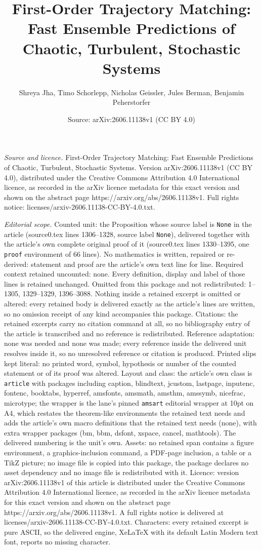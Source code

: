 \documentclass[10pt,a4paper]{amsart}
\title[First-Order Trajectory Matching: Fast Ensemble Predictions o]{First-Order Trajectory Matching: Fast Ensemble Predictions of Chaotic, Turbulent, Stochastic Systems}
\author{Shreya Jha, Timo Schorlepp, Nicholas Geissler, Jules Berman, Benjamin Peherstorfer}
\date{Source: arXiv:2606.11138v1 (CC BY 4.0)}
\begin{document}
\maketitle

\noindent\emph{Source and licence.} First-Order Trajectory Matching: Fast Ensemble Predictions of Chaotic, Turbulent, Stochastic Systems. Version arXiv:2606.11138v1 (CC BY 4.0), distributed under the Creative Commons Attribution 4.0 International licence, as recorded in the arXiv licence metadata for this exact version and shown on the abstract page https://arxiv.org/abs/2606.11138v1. Full rights notice: licenses/arxiv-2606.11138-CC-BY-4.0.txt.\par\smallskip

\noindent\textit{Editorial scope.} Counted unit: the Proposition whose source label is \texttt{None} in the article (source0.tex lines 1306--1328, source label \texttt{None}), delivered together with the article's own complete original proof of it (source0.tex lines 1330--1395, one \texttt{proof} environment of 66 lines). No mathematics is written, repaired or re-derived: statement and proof are the article's own text line for line. Required context retained uncounted: none. Every definition, display and label of those lines is retained unchanged. Omitted from this package and not redistributed: 1--1305, 1329--1329, 1396--3088. Nothing inside a retained excerpt is omitted or altered: every retained body is delivered exactly as the article's lines are written, so no omission receipt of any kind accompanies this package. Citations: the retained excerpts carry no citation command at all, so no bibliography entry of the article is transcribed and no reference is redistributed. Reference adaptation: none was needed and none was made; every reference inside the delivered unit resolves inside it, so no unresolved reference or citation is produced. Printed slips kept literal: no printed word, symbol, hypothesis or number of the counted statement or of its proof was altered. Layout and class: the article's own class is \texttt{article} with packages including caption, blindtext, jcustom, lastpage, inputenc, fontenc, booktabs, hyperref, amsfonts, amsmath, amsthm, amssymb, nicefrac, microtype; the wrapper is the lane's pinned \texttt{amsart} editorial wrapper at 10pt on A4, which restates the theorem-like environments the retained text needs and adds the article's own macro definitions that the retained text needs (none), with extra wrapper packages (bm, bbm, dsfont, xspace, cancel, mathtools). The delivered numbering is the unit's own. Assets: no retained span contains a figure environment, a graphics-inclusion command, a PDF-page inclusion, a table or a TikZ picture; no image file is copied into this package, the package declares no asset dependency and no image file is redistributed with it. Licence: version arXiv:2606.11138v1 of this article is distributed under the Creative Commons Attribution 4.0 International licence, as recorded in the arXiv licence metadata for this exact version and shown on the abstract page https://arxiv.org/abs/2606.11138v1. A full rights notice is delivered at licenses/arxiv-2606.11138-CC-BY-4.0.txt. Characters: every retained excerpt is pure ASCII, so the delivered engine, XeLaTeX with its default Latin Modern text font, reports no missing character.
\end{document}
